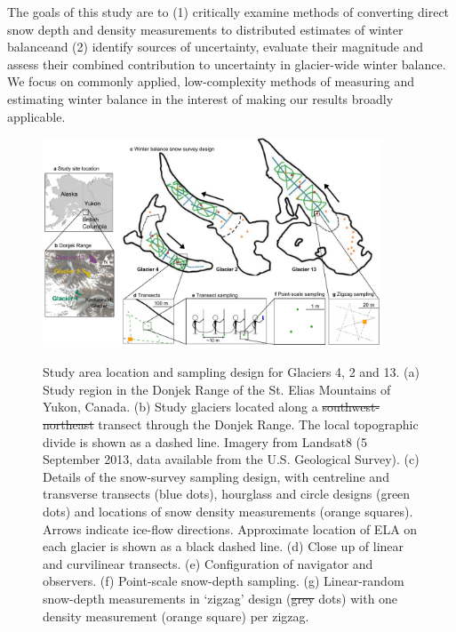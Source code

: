 \documentclass[review,oneside, letterpaper]{igs} %
\providecommand{\DIFadd}[1]{{\protect\color{blue}\uwave{#1}}} %
\providecommand{\DIFdel}[1]{{\protect\color{red}\sout{#1}}}                      %
\providecommand{\DIFaddbegin}{} %
\providecommand{\DIFaddend}{} %
\providecommand{\DIFaddFL}[1]{\DIFadd{#1}} %
\providecommand{\DIFdelFL}[1]{\DIFdel{#1}} %
\providecommand{\DIFaddbeginFL}{} %
\providecommand{\DIFaddendFL}{} %
\providecommand{\DIFdelbeginFL}{} %
\providecommand{\DIFdelendFL}{} %
\newcommand{\DIFscaledelfig}{0.5}
\newlength{\DIFdelgraphicswidth} %
\newlength{\DIFdelgraphicsheight} %
\newcommand{\DIFaddincludegraphics}[2][]{{\color{blue}\fbox{\DIFOincludegraphics[#1]{#2}}}} %
\newcommand{\DIFdelincludegraphics}[2][]{%
\sbox{\DIFdelgraphicsbox}{\DIFOincludegraphics[#1]{#2}}%
\settoboxwidth{\DIFdelgraphicswidth}{\DIFdelgraphicsbox} %
\settoboxtotalheight{\DIFdelgraphicsheight}{\DIFdelgraphicsbox} %
\scalebox{\DIFscaledelfig}{%
\parbox[b]{\DIFdelgraphicswidth}{\usebox{\DIFdelgraphicsbox}\\[-\baselineskip] \rule{\DIFdelgraphicswidth}{0em}}\llap{\resizebox{\DIFdelgraphicswidth}{\DIFdelgraphicsheight}{%
\setlength{\unitlength}{\DIFdelgraphicswidth}%
\begin{picture}(1,1)%
\thicklines\linethickness{2pt} %
{\color[rgb]{1,0,0}\put(0,0){\framebox(1,1){}}}%
{\color[rgb]{1,0,0}\put(0,0){\line( 1,1){1}}}%
{\color[rgb]{1,0,0}\put(0,1){\line(1,-1){1}}}%
\end{picture}%
}\hspace*{3pt}}} %
} %
\DeclareRobustCommand{\DIFaddbegin}{\DIFOaddbegin \let\includegraphics\DIFaddincludegraphics} %
\DeclareRobustCommand{\DIFaddend}{\DIFOaddend \let\includegraphics\DIFOincludegraphics} %
\DeclareRobustCommand{\DIFaddbeginFL}{\DIFOaddbeginFL \let\includegraphics\DIFaddincludegraphics} %
\DeclareRobustCommand{\DIFaddendFL}{\DIFOaddendFL \let\includegraphics\DIFOincludegraphics} %
\DeclareRobustCommand{\DIFdelbeginFL}{\DIFOdelbeginFL \let\includegraphics\DIFdelincludegraphics} %
\DeclareRobustCommand{\DIFdelendFL}{\DIFOaddendFL \let\includegraphics\DIFOincludegraphics} %
\begin{document}
The goals of this study are to (1) critically examine methods of converting direct snow depth and density measurements to distributed estimates of winter balance\DIFaddbegin \DIFadd{; }\DIFaddend and (2) identify sources of uncertainty, evaluate their magnitude and assess their combined contribution to uncertainty in glacier-wide winter balance. We focus on commonly applied, low-complexity methods of measuring and estimating winter balance in the interest of making our results broadly applicable.


\begin{figure}
	\centering
	\includegraphics[width =0.9\textwidth]{Sampling.pdf}\\
	\caption{Study area location and sampling design for Glaciers 4, 2 and 13. (a) Study region in the Donjek Range of the St. Elias Mountains of Yukon, Canada. (b) Study glaciers located along a \DIFdelbeginFL \DIFdelFL{southwest-northeast }\DIFdelendFL \DIFaddbeginFL \DIFaddFL{southwest--northeast }\DIFaddendFL transect through the Donjek Range. The local topographic divide is shown as a dashed line. Imagery from Landsat8 (5 September 2013, data available from the U.S. Geological Survey). (c) Details of the snow-survey sampling design, with centreline and transverse transects (blue dots), hourglass and circle designs (green dots) and locations of snow density measurements (orange squares). Arrows indicate ice-flow directions. Approximate location of ELA on each glacier is shown as a black dashed line. (d) Close up of linear and curvilinear transects. (e) Configuration of navigator and observers. (f) Point-scale snow-depth sampling. (g) Linear-random snow-depth measurements in `zigzag' design (\DIFdelbeginFL \DIFdelFL{grey }\DIFdelendFL \DIFaddbeginFL \DIFaddFL{red }\DIFaddendFL dots) with one density measurement (orange square) per zigzag.}
	\label{fig:Sampling}
\end{figure}
\end{document}
